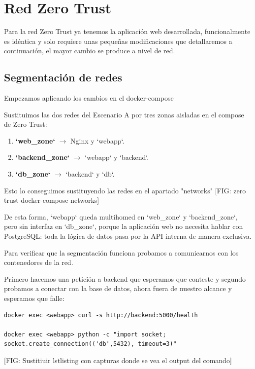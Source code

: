 \documentclass[11pt,spanish,listoffigures,listoftables]{tfgetsinf}
\begin{document}
    
    \section{Red Zero Trust}
    Para la red Zero Trust ya tenemos la aplicación web desarrollada, funcionalmente es idéntica y solo requiere unas pequeñas modificaciones que detallaremos a continuación, el mayor cambio se produce a nivel de red.

        \subsection{Segmentación de redes}
        Empezamos aplicando los cambios en el docker-compose
        
        Sustituimos las dos redes del Escenario A por tres zonas aisladas en el compose de Zero Trust:
        \begin{enumerate}
            \item \textbf{`web\_zone`} $\rightarrow$ Nginx y `webapp`.
            \item \textbf{`backend\_zone`} $\rightarrow$ `webapp` y `backend`.
            \item \textbf{`db\_zone`} $\rightarrow$ `backend` y `db`.
        \end{enumerate}

        Esto lo conseguimos sustituyendo las redes en el apartado "networks"
        [FIG: zero trust docker-compose networks]
        
        De esta forma, `webapp` queda multihomed en `web\_zone` y `backend\_zone`, pero sin interfaz en `db\_zone`, porque la aplicación web no necesita hablar con PostgreSQL: toda la lógica de datos pasa por la API interna de manera exclusiva.
        
        Para verificar que la segmentación funciona probamos a comunicarnos con los contenedores de la red.
        
        Primero hacemos una petición a backend que esperamos que conteste y segundo probamos a conectar con la base de datos, ahora fuera de nuestro alcance y esperamos que falle:
        \begin{lstlisting}
docker exec <webapp> curl -s http://backend:5000/health

docker exec <webapp> python -c "import socket; socket.create_connection(('db',5432), timeout=3)"
        \end{lstlisting}

        [FIG: Sustitiuir lstlisting con capturas donde se vea el output del comando]
        
\end{document}
